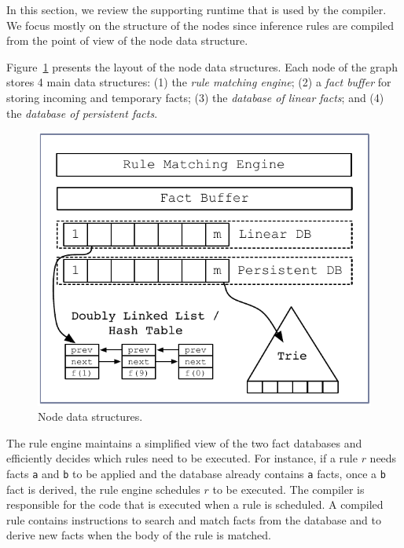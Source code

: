 In this section, we review the supporting runtime that is used by the compiler.
We focus mostly on the structure of the nodes since inference rules are compiled
from the point of view of the node data structure.

Figure~\ref{fig:node} presents the layout of the node data structures.  Each
node of the graph stores 4 main data structures: (1) the \emph{rule matching
   engine}; (2) a \emph{fact buffer} for storing incoming and temporary facts;
(3) the \emph{database of linear facts}; and (4) the \emph{database of
   persistent facts}.

\begin{figure}
\begin{center}
   \includegraphics[width=1\linewidth]{figures/overview.pdf}
\end{center}
\caption{Node data structures.}
\label{fig:node}
\end{figure}


The rule engine maintains a simplified view of the two fact databases and
efficiently decides which rules need to be executed. For instance, if a rule $r$
needs facts \texttt{a} and \texttt{b} to be applied and the database already
contains \texttt{a} facts, once a \texttt{b} fact is derived, the rule engine
schedules $r$ to be executed. The compiler is responsible for the code that is
executed when a rule is scheduled.  A compiled rule contains instructions to
search and match facts from the database and to derive new facts when the body
of the rule is matched.

